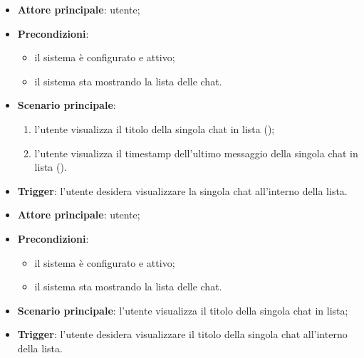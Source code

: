 \documentclass[10pt, a4paper]{article}
\begin{document}
    \begin{itemize}
        \item \textbf{Attore principale}: utente;
        \item \textbf{Precondizioni}:
            \begin{itemize}
                \item il sistema è configurato e attivo;
                \item il sistema sta mostrando la lista delle chat.
            \end{itemize}
        \item \textbf{Scenario principale}:
        \begin{enumerate}
            \item l'utente visualizza il titolo della singola chat in lista ();
            \item l'utente visualizza il timestamp dell'ultimo messaggio della singola chat in lista ().
        \end{enumerate}
        \item \textbf{Trigger}: l’utente desidera visualizzare la singola chat all’interno della lista.
    \end{itemize}

    \begin{itemize}
        \item \textbf{Attore principale}: utente;
        \item \textbf{Precondizioni}:
            \begin{itemize}
                \item il sistema è configurato e attivo;
                \item il sistema sta mostrando la lista delle chat.
            \end{itemize}
        \item \textbf{Scenario principale}: l'utente visualizza il titolo della singola chat in lista;
        \item \textbf{Trigger}: l’utente desidera visualizzare il titolo della singola chat all’interno della lista.
    \end{itemize}
\end{document}
